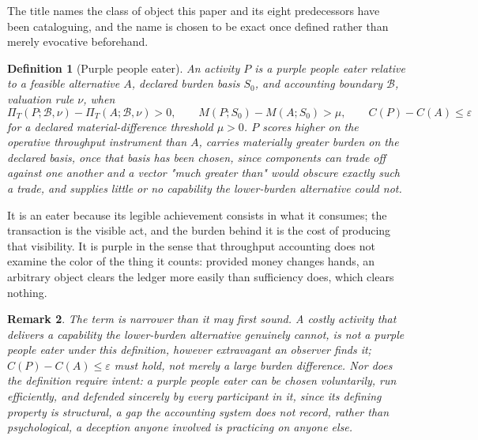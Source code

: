 \documentclass[11pt]{article}
\newtheorem{definition}{Definition}[section]
\newtheorem{remark}[definition]{Remark}
\begin{document}
The title names the class of object this paper and its eight predecessors have been cataloguing, and the name is chosen to be exact once defined rather than merely evocative beforehand.

\begin{definition}[Purple people eater]
An activity $P$ is a purple people eater relative to a feasible alternative $A$, declared burden basis $S_0$, and accounting boundary $\mathcal{B}$, valuation rule $\nu$, when
\[
\Pi_T(P; \mathcal{B}, \nu) - \Pi_T(A; \mathcal{B}, \nu) > 0, \qquad M(P; S_0) - M(A; S_0) > \mu, \qquad C(P) - C(A) \leq \varepsilon
\]
for a declared material-difference threshold $\mu > 0$. $P$ scores higher on the operative throughput instrument than $A$, carries materially greater burden on the declared basis, once that basis has been chosen, since components can trade off against one another and a vector "much greater than" would obscure exactly such a trade, and supplies little or no capability the lower-burden alternative could not.
\end{definition}

It is an eater because its legible achievement consists in what it consumes; the transaction is the visible act, and the burden behind it is the cost of producing that visibility. It is purple in the sense that throughput accounting does not examine the color of the thing it counts: provided money changes hands, an arbitrary object clears the ledger more easily than sufficiency does, which clears nothing.

\begin{remark}
The term is narrower than it may first sound. A costly activity that delivers a capability the lower-burden alternative genuinely cannot, is not a purple people eater under this definition, however extravagant an observer finds it; $C(P) - C(A) \leq \varepsilon$ must hold, not merely a large burden difference. Nor does the definition require intent: a purple people eater can be chosen voluntarily, run efficiently, and defended sincerely by every participant in it, since its defining property is structural, a gap the accounting system does not record, rather than psychological, a deception anyone involved is practicing on anyone else.
\end{remark}
\end{document}
